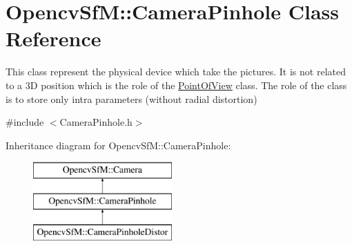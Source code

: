 \hypertarget{class_opencv_sf_m_1_1_camera_pinhole}{
\section{OpencvSfM::CameraPinhole Class Reference}
\label{class_opencv_sf_m_1_1_camera_pinhole}
}


This class represent the physical device which take the pictures. It is not related to a 3D position which is the role of the \hyperlink{class_opencv_sf_m_1_1_point_of_view}{PointOfView} class. The role of the class is to store only intra parameters (without radial distortion)  




{\ttfamily \#include $<$CameraPinhole.h$>$}

Inheritance diagram for OpencvSfM::CameraPinhole:\begin{figure}[H]
\begin{center}
\leavevmode
\includegraphics[height=3.000000cm]{class_opencv_sf_m_1_1_camera_pinhole}
\end{center}
\end{figure}
